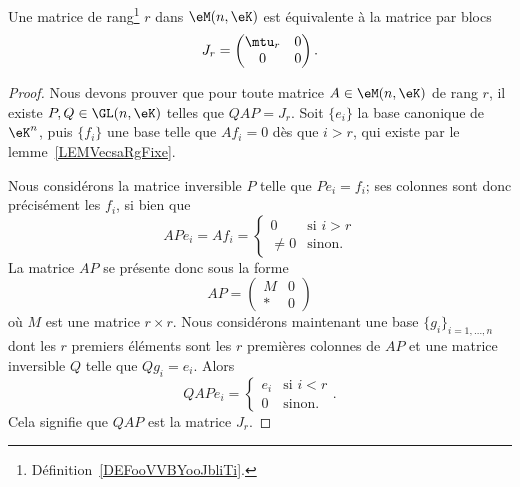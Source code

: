 \begin{lemma}   \label{LemZMxxnfM}
    Une matrice de rang\footnote{Définition~\ref{DEFooVVBYooJbliTi}.} \( r\) dans \( \eM(n,\eK)\) est équivalente à la matrice par blocs
    \begin{equation}
        J_r=\begin{pmatrix}
            \mtu_r    &   0    \\
            0    &   0
        \end{pmatrix}.
    \end{equation}
\end{lemma}

\begin{proof}
    Nous devons prouver que pour toute matrice \( A\in\eM(n,\eK)\) de rang \( r\), il existe \( P,Q\in\GL(n,\eK)\) telles que \(QAP=J_r\). Soit \( \{ e_i \}\) la base canonique de \( \eK^n\), puis \( \{ f_i \}\) une base telle que \( Af_i=0\) dès que \( i>r\), qui existe par le lemme~\ref{LEMVecsaRgFixe}.

    Nous considérons la matrice inversible \( P\) telle que \( Pe_i=f_i\); ses colonnes sont donc précisément les \( f_i \), si bien que
    \begin{equation}
        APe_i=Af_i=\begin{cases}
            0    &   \text{si } i>r\\
            \neq 0    &    \text{sinon}.
        \end{cases}
    \end{equation}
    La matrice \( AP\) se présente donc sous la forme
    \begin{equation}
        AP=\begin{pmatrix}
            M    &   0    \\
            *    &   0
        \end{pmatrix}
    \end{equation}
    où \( M\) est une matrice \( r\times r\). Nous considérons maintenant une base \( \{ g_i \}_{i=1,\ldots, n}\) dont les \( r\) premiers éléments sont les \( r\) premières colonnes de \( AP\) et une matrice inversible \( Q\) telle que \( Qg_i=e_i\). Alors
    \begin{equation}
        QAPe_i=\begin{cases}
            e_i    &   \text{si } i<r\\
            0    &    \text{sinon}.
        \end{cases}.
    \end{equation}
    Cela signifie que \( QAP\) est la matrice \( J_r\).
\end{proof}

